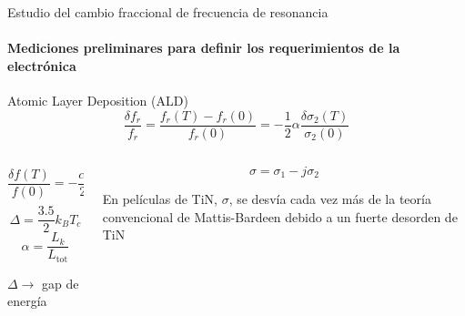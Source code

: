 \documentclass[ignorenonframetext,12pt]{beamer}
\begin{document}
		\begin{frame}{Estudio del cambio fraccional de frecuencia de resonancia}
			\framesubtitle{Mediciones preliminares para definir los requerimientos
			de la electrónica}
			Atomic Layer Deposition (ALD)
			\begin{equation*}
				\frac{\delta f_r}{f_r} = \frac{f_r(T) -
				f_r(0)}{f_r(0)} = -\frac{1}{2}\alpha\frac{\delta
				\sigma_2(T)}{\sigma_2(0)}
			\end{equation*}
			\begin{columns}
				\begin{column}{0.49\textwidth}
					{\color{blue}\begin{equation*}
						\frac{\delta f(T)}{f(0)} = 
						-\frac{\alpha}{2}\sqrt{\frac{\pi \Delta}{2 k_B
						T}} e^{-\frac{\Delta}{k_B T}}
					\end{equation*}}
					\begin{equation*}
						\Delta = \frac{3.5}{2} k_B T_c
					\end{equation*}
					\begin{equation*}
						\alpha = \frac{L_k}{L_\text{tot}}
					\end{equation*}

					$\Delta \to$ gap de energía
				\end{column}
				\begin{column}{0.49\textwidth}
					\begin{equation*}
						\sigma = \sigma_1 - j \sigma_2
					\end{equation*}

					En películas de TiN, $\sigma$, se desvía cada vez más de la
					teoría convencional	de Mattis-Bardeen debido a un \alert{fuerte
					desorden de TiN}
				\end{column}
			\end{columns}
		\end{frame}
\end{document}
